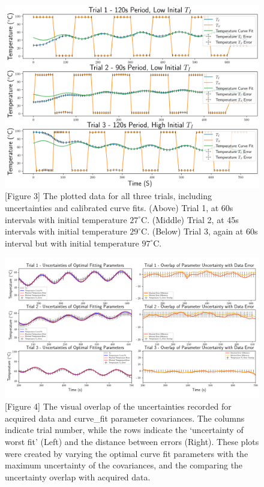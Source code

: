 \documentclass[11pt]{article}
\begin{document}
\vspace{0pt}

    \begin{figure}[H]
        \centering 
        \includegraphics[width=5.5in]{data plots.png}
        \caption*{[Figure 3] The plotted data for all three trials, including uncertainties and calibrated curve fits. (Above) Trial 1, at 60s intervals with initial temperature $27^\circ$C. (Middle) Trial 2, at 45s intervals with initial temperature $29^\circ$C. (Below) Trial 3, again at 60s interval but with initial temperature $97^\circ$C. }
    \end{figure}

\vspace{-20pt}

    \begin{figure}[H]
        \centering 
        \includegraphics[width=7in]{uncertainty data.png}
        \caption*{[Figure 4] The visual overlap of the uncertainties recorded for acquired data and curve\_fit parameter covariances. The columns indicate trial number, while the rows indicate the `uncertainty of worst fit' (Left) and the distance between errors (Right). These plots were created by varying the optimal curve fit parameters with the maximum uncertainty of the covariances, and the comparing the uncertainty overlap with acquired data. }
    \end{figure}
\end{document}
